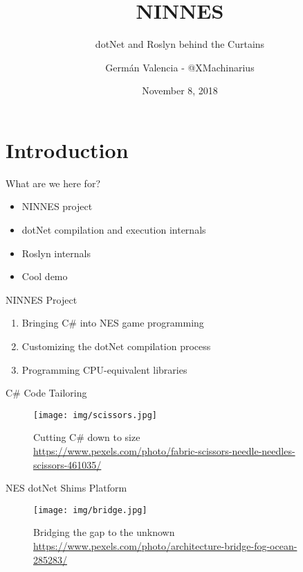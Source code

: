 \documentclass[10pt]{beamer}
\title{NINNES}
\subtitle{dotNet and Roslyn behind the Curtains}
\date{November 8, 2018}
\author{Germán Valencia - @XMachinarius}
\institute{Growth Acceleration Partners}
\begin{document}
\maketitle

\section{Introduction}
\begin{frame}{What are we here for?}
    \begin{itemize}
        \item NINNES project
        \item dotNet compilation and execution internals
        \item Roslyn internals
        \item Cool demo
    \end{itemize}
\end{frame}

\begin{frame}{NINNES Project}
    \begin{enumerate}
        \item Bringing C\# into NES game programming
        \item Customizing the dotNet compilation process
        \item Programming CPU-equivalent libraries
    \end{enumerate}
\end{frame}

\begin{frame}{C\# Code Tailoring}
    \begin{figure}
        \centering
        \texttt{[image: img/scissors.jpg]}
        \caption{Cutting C\# down to size \\ \tiny{\href{Photo by Pixabay, taken from Pexels}{https://www.pexels.com/photo/fabric-scissors-needle-needles-scissors-461035/}}}
    \end{figure}
\end{frame}

\begin{frame}{NES dotNet Shims Platform}
    \begin{figure}
        \centering
        \texttt{[image: img/bridge.jpg]}
        \caption{Bridging the gap to the unknown \\ \tiny{\href{Photo by Nikolai Ulltang from Pexels}{https://www.pexels.com/photo/architecture-bridge-fog-ocean-285283/}}}
    \end{figure}
\end{frame}
\end{document}
